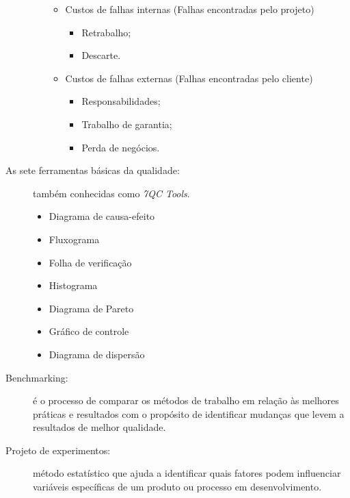 \begin{description}
\begin{itemize}
\begin{itemize}
			\item Custos de falhas internas (Falhas encontradas pelo projeto)
			
			\begin{itemize}
				
				\item Retrabalho;
				
				\item Descarte.
				
			\end{itemize}
			
			\item Custos de falhas externas (Falhas encontradas pelo cliente)	
			
			\begin{itemize}
				
				\item Responsabilidades;
				
				\item Trabalho de garantia;
				
				\item Perda de negócios.

			\end{itemize}
						
		\end{itemize}
	
	\end{itemize}

	\item[As sete ferramentas básicas da qualidade:] também conhecidas como \textit{7QC Tools}.
	
		\begin{itemize}
			\item Diagrama de causa-efeito
			\item Fluxograma
			\item Folha de verificação
			\item Histograma
			\item Diagrama de Pareto
			\item Gráfico de controle
			\item Diagrama de dispersão			
		\end{itemize}
	
	\item[Benchmarking:] é o processo de comparar os métodos de trabalho em relação às melhores práticas e resultados com o propósito de identificar mudanças que levem a resultados de melhor qualidade.
	
	\item[Projeto de experimentos:] método estatístico que ajuda a identificar quais fatores podem influenciar variáveis específicas de um produto ou processo em desenvolvimento.
	

\end{description}
